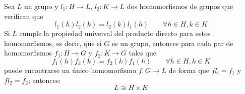 \begin{teo}
   Sea $L$  un grupo y $l_1:H\to L$, $l_2:K\to L$ dos homomorfismos de grupos que verifican que
   \begin{equation*}
       l_1(h)l_2(k) = l_2(k)l_1(h) \qquad \forall h\in H, k\in K
   \end{equation*}
   Si $L$ cumple la propiedad universal del producto directo para estos homomorfismos, es decir, que si $G$ es un grupo, entonces para cada par de homomorfismos $f_1:H\to G$ y $f_2:K\to G$ tales que
   \begin{equation*}
       f_1(h)f_2(k) = f_2(k)f_1(h) \qquad \forall h\in H, k\in K
   \end{equation*}
   puede encontrarse un único homomorfismo $f:G\to L$ de forma que $fl_i = f_1$ y $fl_2 = f_2$; entonces:
   \begin{equation*}
       L \cong H\times K
   \end{equation*}

   \begin{figure}[H]
       \centering
   \end{figure}


\end{teo}
